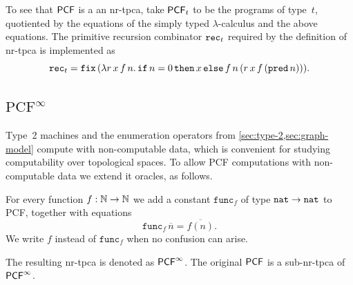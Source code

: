 To see that $\mathsf{PCF}$ is a an nr-tpca, take $\mathsf{PCF}_t$ to be the programs of
type~$t$, quotiented by the equations of the simply typed $\lambda$-calculus and the above equations.
%
The primitive recursion combinator $\mathtt{rec}_t$ required by the definition of nr-tpca is implemented as
%
\begin{equation*}  
  \mathtt{rec}_t =
  \mathtt{fix} \,
  (\lambda r\,x\,f\,n .\,\mathtt{if}\,n = 0\,\mathtt{then}\,x\,\mathtt{else}\,f\,n\,(r \, x\, f \, (\mathtt{pred}\, n))).
\end{equation*}

\subsection[\texorpdfstring{$\text{PCF}^\infty$}{PCF-infinity}]{$\text{PCF}^\infty$}

Type~2 machines and the enumeration operators from \cref{sec:type-2,sec:graph-model}
compute with non-computable data, which is convenient for studying computability over topological spaces. To allow PCF computations with non-computable data we extend it oracles, as follows.

For every function $f : \mathbb{N} \to \mathbb{N}$ we add a constant $\mathtt{func}_f$
of type $\mathtt{nat} \to \mathtt{nat}$ to PCF, together with equations
%
\begin{equation*}
  \mathtt{func}_f \, \overline{n} = \overline{f(n)}.
\end{equation*}
%
We write $f$ instead of $\mathtt{func}_f$ when no confusion can arise.

The resulting nr-tpca is denoted as $\mathsf{PCF}^\infty$. The original $\mathsf{PCF}$ is a sub-nr-tpca of~$\mathsf{PCF}^\infty$.




